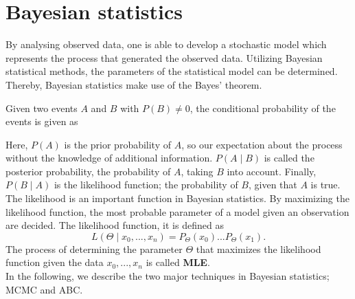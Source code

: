 \section{Bayesian statistics} 
\label{section:Baystat}
By analysing observed data, one is able to develop a stochastic model which represents the process that generated the observed data. Utilizing Bayesian statistical methods, the parameters of the statistical model can be determined. Thereby, Bayesian statistics make use of the Bayes' theorem\cite{BayStat}.\newline
\begin{definition}
Given two events $A$ and $B$ with $P(B) \neq 0$, the conditional probability of the events is given as\\
\end{definition}
Here, $P(A)$ is the prior probability of $A$, so our expectation about the process without the knowledge of additional information. $P(A \mid B)$ is called the posterior probability, the probability of $A$, taking $B$ into account. Finally, $P(B \mid A)$ is the likelihood function; the probability of $B$, given that $A$ is true.\newline
The likelihood is an important function in Bayesian statistics. By maximizing the likelihood function, the most probable parameter of a model given an observation are decided. The likelihood function, it is defined as 
\begin{equation}
L(\Theta \mid x_0,...,x_n) = P_{\Theta}(x_0) ... P_{\Theta}(x_1).
\end{equation}
The process of determining the parameter $\Theta$ that maximizes the likelihood function given the data ${x_0,...,x_n}$ is called \textbf{\acf{MLE}}.\\

In the following, we describe the two major techniques in Bayesian statistics; \acf{MCMC} and \acf{ABC}.\\

